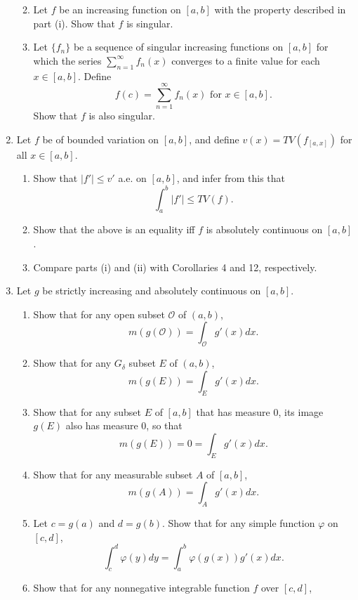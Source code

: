 \begin{enumerate}
\begin{enumerate}[label=(\roman*),align=left]
\[        \]
        \item Let $f$ be an increasing function on $[a,b]$ with the property described in part (i). Show that $f$ is singular.
        \item Let $\{f_n\}$ be a sequence of singular increasing functions on $[a,b]$ for which the series $\sum_{n=1}^\infty f_n(x)$ converges to a finite value for each $x\in[a,b]$. Define 
        \[
            f(c)=\sum_{n=1}^\infty f_n(x)\text{ for }x\in[a,b].  
        \]
        Show that $f$ is also singular.
    \end{enumerate}
    \item Let $f$ be of bounded variation on $[a,b]$, and define $v(x)=TV(f_{[a,x]})$ for all $x\in[a,b]$.
    \begin{enumerate}[label=(\roman*),align=left]
        \item Show that $|f'|\le v'$ a.e. on $[a,b]$, and infer from this that 
        \[
            \int_a^b|f'|\le TV(f).  
        \]
        \item Show that the above is an equality iff $f$ is absolutely continuous on $[a,b]$.
        \item Compare parts (i) and (ii) with Corollaries 4 and 12, respectively.
    \end{enumerate}
    \item Let $g$ be strictly increasing and absolutely continuous on $[a,b]$.
    \begin{enumerate}[label=(\roman*),align=left]
        \item Show that for any open subset $\mathcal{O}$ of $(a,b)$,
        \[
            m(g(\mathcal{O}))=\int_{\mathcal{O}}g'(x)dx.  
        \]
        \item Show that for any $G_\delta$ subset $E$ of $(a,b)$,
        \[
            m(g(E))=\int_Eg'(x)dx.  
        \]
        \item Show that for any subset $E$ of $[a,b]$ that has measure 0, its image $g(E)$ also has measure 0, so that
        \[
            m(g(E))=0=\int_{E}g'(x)dx.  
        \]
        \item Show that for any measurable subset $A$ of $[a,b]$,
        \[
            m(g(A))=\int_{A}g'(x)dx.  
        \]
        \item Let $c=g(a)$ and $d=g(b)$. Show that for any simple function $\varphi$ on $[c,d]$,
        \[
            \int_c^d\varphi(y)dy=\int_a^b\varphi(g(x))g'(x)dx.
        \]
        \item Show that for any nonnegative integrable function $f$ over $[c,d]$,

\end{enumerate}
\end{enumerate}
